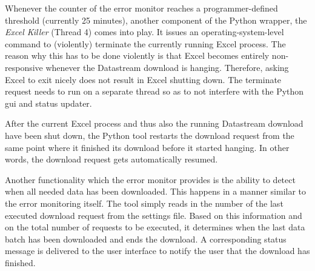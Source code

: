 Whenever the counter of the error monitor reaches a programmer-defined threshold (currently 25 minutes), another component of the Python wrapper, the \textit{Excel Killer} (Thread 4) comes into play. It issues an operating-system-level command to (violently) terminate the currently running Excel process. The reason why this has to be done violently is that Excel becomes entirely non-responsive whenever the Datastream download is hanging. Therefore, asking Excel to exit nicely does not result in Excel shutting down. The terminate request needs to run on a separate thread so as to not interfere with the Python gui and status updater. 

After the current Excel process and thus also the running Datastream download have been shut down, the Python tool restarts the download request from the same point where it finished its download before it started hanging. In other words, the download request gets automatically resumed. 

Another functionality which the error monitor provides is the ability to detect when all needed data has been downloaded. This happens in a manner similar to the error monitoring itself. The tool simply reads in the number of the last executed download request from the settings file. Based on this information and on the total number of requests to be executed, it determines when the last data batch has been downloaded and ends the download. A corresponding status message is delivered to the user interface to notify the user that the download has finished. 










